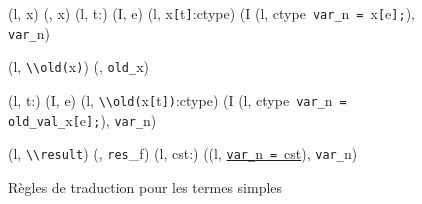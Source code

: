 \begin{figure*}[h!]
  \scriptsize{
    {
      {}
      {(l, x) \trule (\emptylist, x)}{}
    }
    {
      {(l, t:) \trule (I, e)}
      {(l, x\mbox{\lstinline'['}t\mbox{\lstinline']'}:ctype) \trule
        (I \concat (l, ctype~\mbox{\lstinline'var_'}n~\mbox{\lstinline'='}~x\mbox{\lstinline'['}e\mbox{\lstinline'];'}),
        \mbox{\lstinline'var_'}n)
      }{}
    }

    {
      {}
      {(l, \mbox{\lstinline'\\old('}x\mbox{\lstinline')'}) \trule
        (\emptylist, \mbox{\lstinline'old_'}x)}{}
    }

    {
      {(l, t:) \trule (I, e)}
      {(l, \mbox{\lstinline'\\old('}x\mbox{\lstinline'['}t\mbox{\lstinline'])'}:ctype) \trule
        (I \concat (l, ctype~\mbox{\lstinline'var_'}n~\mbox{\lstinline'= old_val_'}x\mbox{\lstinline'['}e\mbox{\lstinline'];'}),
        \mbox{\lstinline'var_'}n)
      }{}
    }

    {
      {}
      {(l, \mbox{\lstinline'\\result'}) \trule
        (\emptylist, \mbox{\lstinline'res'}_f)}{}
    }
    {
      {}
      {(l, cst:) \trule
        ((l, \underline{\Zinit\mbox{\lstinline'var_'}n~\mbox{\lstinline'='}~cst}\semicolon),
        \mbox{\lstinline'var_'}n)}{}
    }
  }
  \caption{Règles de traduction pour les termes simples}
  \label{fig:const-id}
\end{figure*}
